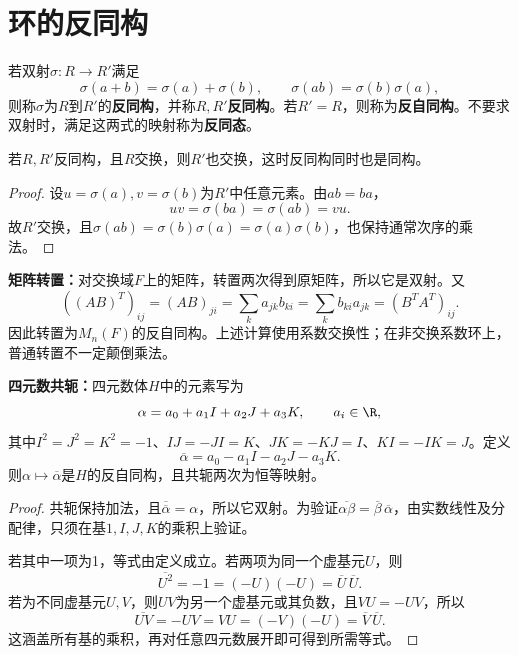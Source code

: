 \section{环的反同构}


\begin{definition}\label{p2:concept:c3-antiisomorphism}
若双射$\sigma:R\to R'$满足
\[
\sigma(a+b)=\sigma(a)+\sigma(b),\qquad
\sigma(ab)=\sigma(b)\sigma(a),
\]
则称$\sigma$为$R$到$R'$的\textbf{反同构}，并称$R,R'$\textbf{反同构}。若$R'=R$，则称为\textbf{反自同构}。不要求双射时，满足这两式的映射称为\textbf{反同态}。
\end{definition}

\begin{proposition}
若$R,R'$反同构，且$R$交换，则$R'$也交换，这时反同构同时也是同构。
\end{proposition}
\begin{proof}
设$u=\sigma(a),v=\sigma(b)$为$R'$中任意元素。由$ab=ba$，
\[
uv=\sigma(ba)=\sigma(ab)=vu.
\]
故$R'$交换，且$\sigma(ab)=\sigma(b)\sigma(a)=\sigma(a)\sigma(b)$，也保持通常次序的乘法。
\end{proof}

\begin{example}
\textbf{矩阵转置：}对交换域$F$上的矩阵，转置两次得到原矩阵，所以它是双射。又
\[
((AB)^T)_{ij}=(AB)_{ji}=\sum_k a_{jk}b_{ki}
=\sum_k b_{ki}a_{jk}=(B^TA^T)_{ij}.
\]
因此转置为$M_n(F)$的反自同构。上述计算使用系数交换性；在非交换系数环上，普通转置不一定颠倒乘法。
\end{example}

\begin{example}
\textbf{四元数共轭：}四元数体$H$中的元素写为
\[
\alpha=a_0+a_1I+a_2J+a_3K,\qquad a_i\in\R,
\]
其中$I^2=J^2=K^2=-1$、$IJ=-JI=K$、$JK=-KJ=I$、$KI=-IK=J$。定义
\[
\overline\alpha=a_0-a_1I-a_2J-a_3K.
\]
则$\alpha\mapsto\overline\alpha$是$H$的反自同构，且共轭两次为恒等映射。
\end{example}
\begin{proof}
共轭保持加法，且$\overline{\overline\alpha}=\alpha$，所以它双射。为验证$\overline{\alpha\beta}=\overline\beta\,\overline\alpha$，由实数线性及分配律，只须在基$1,I,J,K$的乘积上验证。

若其中一项为1，等式由定义成立。若两项为同一个虚基元$U$，则
\[
\overline{U^2}=-1=(-U)(-U)=\overline U\,\overline U.
\]
若为不同虚基元$U,V$，则$UV$为另一个虚基元或其负数，且$VU=-UV$，所以
\[
\overline{UV}=-UV=VU=(-V)(-U)=\overline V\,\overline U.
\]
这涵盖所有基的乘积，再对任意四元数展开即可得到所需等式。
\end{proof}

